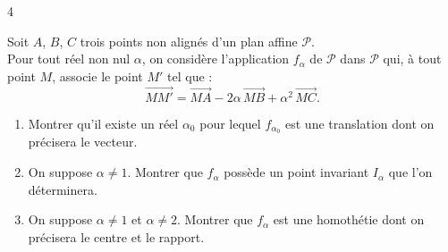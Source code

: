 \documentclass{axiobac}
\begin{document}
\begin{exercice}{4}

Soit $A$, $B$, $C$ trois points non alignés d'un plan affine $\mathcal{P}$. \\
Pour tout réel non nul $\alpha$, on considère l'application $f_\alpha$ de $\mathcal{P}$ dans $\mathcal{P}$ qui, à tout point $M$, associe le point $M'$ tel que :
\[
\overrightarrow{MM'} = \overrightarrow{MA} - 2\alpha\,\overrightarrow{MB} + \alpha^2\,\overrightarrow{MC} .
\]

\begin{enumerate}
    \item Montrer qu'il existe un réel $\alpha_0$ pour lequel $f_{\alpha_0}$ est une translation dont on précisera le vecteur.
    \item On suppose $\alpha \neq 1$. Montrer que $f_\alpha$ possède un point invariant $I_\alpha$ que l'on déterminera.
    \item On suppose $\alpha \neq 1$ et $\alpha \neq 2$. Montrer que $f_\alpha$ est une homothétie dont on précisera le centre et le rapport.
\end{enumerate}

\end{exercice}
\end{document}
